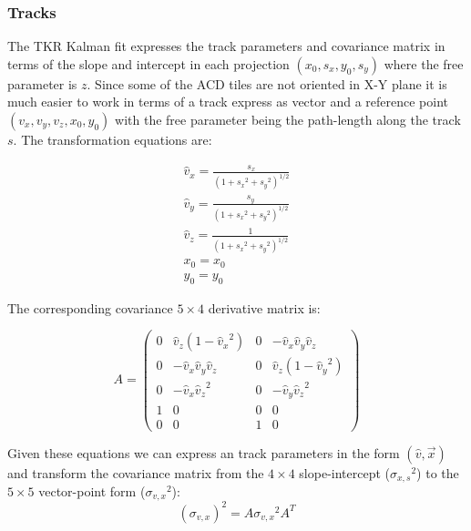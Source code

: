 \documentclass[fleqn,twoside,draft]{article}
\begin{document}
\subsubsection{Tracks}

The TKR Kalman fit expresses the track parameters and covariance matrix in terms of the slope and intercept in each projection $(x_0,s_x,y_0,s_y)$ where the free parameter is $z$.  Since some of the ACD tiles are not oriented in X-Y plane it is much easier to work in terms of a track express as vector and a reference point $(v_x,v_y,v_z,x_0,y_0)$ with the free parameter being the path-length along the track $s$.  The transformation equations are:

\begin{subequations}
  \begin{gather}
    \hat{v}_x = \frac{s_x}{(1 + {s_x}^2 + {s_y}^2)^{1/2}} \\
    \hat{v}_y = \frac{s_y}{(1 + {s_x}^2 + {s_y}^2)^{1/2}} \\
    \hat{v}_z = \frac{1}{(1 + {s_x}^2 + {s_y}^2)^{1/2}} \\
    x_0 = x_0 \\
    y_0 = y_0 
  \end{gather}
\end{subequations}

The corresponding covariance $5\times4$ derivative matrix is:

\begin{equation}
  A = 
  \begin{pmatrix}
    0 & \hat{v}_z ( 1 - { \hat{v}_x } ^2 ) & 0 & -\hat{v}_x\hat{v}_y\hat{v}_z \\
    0 & -\hat{v}_x\hat{v}_y\hat{v}_z & 0 & \hat{v}_z ( 1 - { \hat{v}_y } ^2 ) \\
    0 & -\hat{v}_x{\hat{v}_z}^2 & 0 & -\hat{v}_y{\hat{v}_z}^2\\
    1 & 0 & 0 & 0 \\
    0 & 0 & 1 & 0 
  \end{pmatrix}
\end{equation}

Given these equations we can express an track parameters in the form $(\hat{v},\vec{x})$ and transform the covariance matrix from the $4\times4$ slope-intercept (${\sigma_{x,s}}^2$) to the $5\times5$ vector-point form (${\sigma_{v,x}}^2$):
\begin{equation}
  (\sigma_{v,x})^2 = A {\sigma_{v,x}}^2 A^T
\end{equation}
\end{document}
